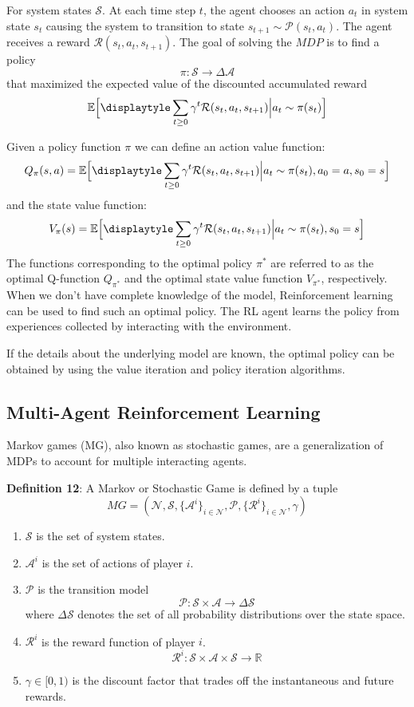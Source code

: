 \documentclass[conference]{IEEEtran}
\begin{document}
\par For  system states $\mathcal{S}$. At each time step $t$, the agent chooses an action $a_t$ in system state $s_t$ causing the system to transition to state $s_{t+1} \sim \mathcal{P}(s_t, a_t)$. The agent receives a reward $\mathcal{R}(s_t, a_t, s_{t+1})$. The goal of solving the $MDP$ is to find a policy $$\pi \mathpunct{:} \mathcal{S} \to \Delta \mathcal{A}$$ that maximized the expected value of the discounted accumulated reward $$\mathbb{E}\Big[\displaytyle\sum_{t\geq 0}\gamma^t\mathcal{R}(s_t, a_t, s_{t+1})\Big| a_t \sim \pi(s_t)\Big]$$

\par Given a policy function $\pi$ we can define an action value function: $$Q_{\pi}(s, a) = \mathbb{E}\Big[\displaytyle\sum_{t\geq 0}\gamma^t\mathcal{R}(s_t, a_t, s_{t+1})\Big| a_t \sim \pi(s_t), a_0 = a, s_0 = s\Big]$$ and the state value function:
$$V_{\pi}(s) = \mathbb{E}\Big[\displaytyle\sum_{t\geq 0}\gamma^t\mathcal{R}(s_t, a_t, s_{t+1})\Big| a_t \sim \pi(s_t), s_0 = s\Big]$$ The functions corresponding to the optimal policy $\pi^*$ are referred to as the optimal Q-function $Q_{\pi^*}$ and the optimal state value function $V_{\pi^*}$, respectively. When we don't have complete knowledge of the model, Reinforcement learning can be used to find such an optimal policy. The RL agent learns the policy from experiences collected by interacting with the environment. 

\par If the details about the underlying model are known, the optimal policy can be obtained by using the value iteration and policy iteration algorithms.  

\subsection{Multi-Agent Reinforcement Learning}

Markov games (MG), also known as stochastic games, are a generalization of MDPs to account for multiple interacting agents.

\textbf{Definition 12}: A Markov or Stochastic Game is defined by a tuple $$MG = (\mathcal{N}, \mathcal{S}, \{\mathcal{A}^i\}_{i\in\mathcal{N}} , \mathcal{P}, \{\mathcal{R}^i\}_{i\in\mathcal{N}}, \gamma)$$
\begin{enumerate}
\item $\mathcal{S}$ is the set of system states.
\item $\mathcal{A}^i$ is the set of actions of player $i$.
\item $\mathcal{P}$ is the transition model $$\mathcal{P} \mathpunct{:} \mathcal{S} \times \mathcal{A} \to \Delta \mathcal{S}$$ where $\Delta \mathcal{S}$ denotes the set of all probability distributions over the state space.
\item $\mathcal{R}^i$ is the reward function of player $i$.
$$\mathcal{R}^i \mathpunct{:} \mathcal{S} \times \mathcal{A} \times \mathcal{S} \to \mathbb{R}$$
\item $\gamma \in [0, 1)$ is the discount factor that trades off the instantaneous and
future rewards.

\end{enumerate}
\end{document}
